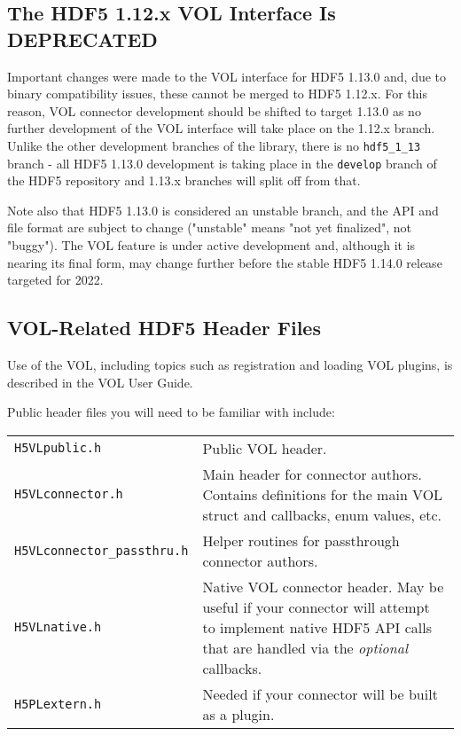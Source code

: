 \subsection{The HDF5 1.12.x VOL Interface Is DEPRECATED}

Important changes were made to the VOL interface for HDF5 1.13.0 and, due to
binary compatibility issues, these cannot be merged to HDF5 1.12.x. For this
reason, VOL connector development should be shifted to target 1.13.0 as no
further development of the VOL interface will take place on the 1.12.x branch.
Unlike the other development branches of the library, there is no
{\tt hdf5\_1\_13} branch - all HDF5 1.13.0 development is taking place in
the {\tt develop} branch of the HDF5 repository and 1.13.x branches will split
off from that.

Note also that HDF5 1.13.0 is considered an unstable branch, and the API and
file format are subject to change ("unstable" means "not yet finalized", not "buggy").
The VOL feature is under active development and, although it is nearing its final form,
may change further before the stable HDF5 1.14.0 release targeted for 2022.

\subsection{VOL-Related HDF5 Header Files}

Use of the VOL, including topics such as registration and loading VOL plugins, is
described in the VOL User Guide.

Public header files you will need to be familiar with include:

\begin{tabularx}{\linewidth}{ l X }
  \texttt{H5VLpublic.h} & Public VOL header.\\
  \texttt{H5VLconnector.h} & Main header for connector authors. Contains definitions for the main VOL struct and callbacks, enum values, etc.\\
  \texttt{H5VLconnector\_passthru.h} & Helper routines for passthrough connector authors.\\
    \texttt{H5VLnative.h} & Native VOL connector header. May be useful if your connector will attempt to implement native HDF5 API calls that are handled via the \textit{optional} callbacks.\\
  \texttt{H5PLextern.h} & Needed if your connector will be built as a plugin.\\
\end{tabularx}

